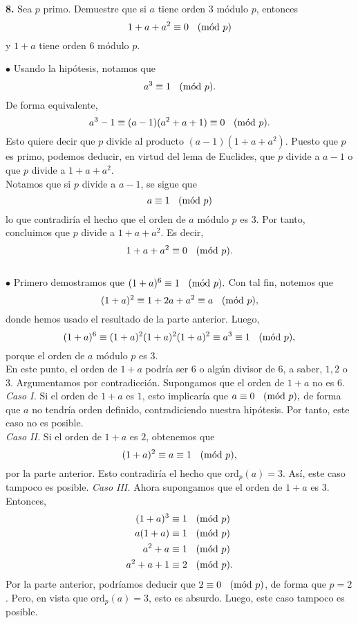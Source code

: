 \documentclass{article}
\newcommand{\Mod}[1]{\ \hspace{0.2cm} (\mathrm{m\acute{o}d}\ #1)}
\begin{document}
\vspace{7mm}


\begin{mybox}
	\textbf{8. } Sea $p$ primo. Demuestre que si $a$ tiene orden $3$ módulo $p$, entonces 
	$$ 1 + a + a^2 \equiv 0 \Mod{p} $$
	y $1 + a$ tiene orden $6$ módulo $p$.
\end{mybox}	
$\bullet$ Usando la hipótesis, notamos que 
$$a^{3} \equiv 1  \Mod{p} .$$
De forma equivalente, 
$$ a^{3} - 1 \equiv (a - 1)(a^2 + a + 1) \equiv 0 \Mod{p} .$$
Esto quiere decir que $p$ divide al producto $(a - 1)(1 + a + a^2)$. Puesto que $p$ es primo, podemos deducir, en virtud del lema de Euclides, que $p$ divide a $a - 1$ o que $p$ divide a $1 + a + a^2$.\\
Notamos que si $p$ divide a $a - 1$, se sigue que 
$$ a \equiv 1 \Mod{p} $$
lo que contradiría el hecho que el orden de $a$ módulo $p$ es $3$.  Por tanto, concluimos que $p$ divide a $1 + a + a^2$. Es decir,
$$ 1 + a + a^2 \equiv 0 \Mod{p} .$$ \\
$\bullet$ Primero demostramos que $(1 + a)^6 \equiv 1 \Mod{p}.$ Con tal fin, notemos que
$$ (1 + a)^2 \equiv 1 + 2a + a^{2}  \equiv a \Mod{p} ,$$
donde hemos usado el resultado de la parte anterior. Luego,
$$ (1 + a)^6 \equiv (1 + a)^{2} (1 + a)^{2} (1 + a)^{2} \equiv a^{3} \equiv 1 \Mod{p}, $$
porque el orden de $a$ módulo $p$ es $3$. \\

En este punto, el orden de $1+a$ podría ser $6$ o algún divisor de $6$, a saber, $1, 2$ o $3$. Argumentamos por contradicción. Supongamos que el orden de $1+a$ no es $6$. \\

\textit{Caso I. } Si el orden de $1 + a$ es $1$, esto implicaría que $a \equiv 0 \Mod{p},$ de forma que $a$ no tendría orden definido, contradiciendo nuestra hipótesis. Por tanto, este caso no es posible.  \\

\textit{Caso II. } Si el orden de $1 + a$ es $2$, obtenemos que 
$$ (1 + a)^2 \equiv a \equiv 1 \Mod{p}, $$
por la parte anterior. Esto contradiría el hecho que $\text{ord}_{p}(a) = 3.$ Así, este caso tampoco es posible. 
\newpage
\textit{Caso III. } Ahora supongamos que el orden de $1 + a$ es $3$. Entonces, 
\begin{equation*}
\begin{split}
(1 + a)^3 &\equiv 1 \Mod{p} \\
a(1 + a) &\equiv 1 \Mod{p} \\
a^2 + a & \equiv 1 \Mod{p} \\
a^2 + a + 1 &\equiv 2 \Mod{p}.
\end{split}
\end{equation*}
Por la parte anterior, podríamos deducir que $2 \equiv 0 \Mod{p}$, de forma que $ p = 2$. Pero, en vista que $\text{ord}_{p} (a) = 3$, esto es absurdo. Luego, este caso tampoco es posible.  \\
\end{document}
